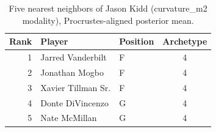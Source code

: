 \begin{table}[htbp]
  \centering\small
  \begin{tabular}{rllc}
    \toprule
    Rank & Player & Position & Archetype \\
    \midrule
    1 & Jarred Vanderbilt & F & 4 \\
    2 & Jonathan Mogbo & F & 4 \\
    3 & Xavier Tillman Sr. & F & 4 \\
    4 & Donte DiVincenzo & G & 4 \\
    5 & Nate McMillan & G & 4 \\
    \bottomrule
  \end{tabular}
  \caption{Five nearest neighbors of Jason Kidd (curvature_m2 modality), Procrustes-aligned posterior mean.}
  \label{tab:Jason_Kidd_neighbors_curvature_m2}
\end{table}


